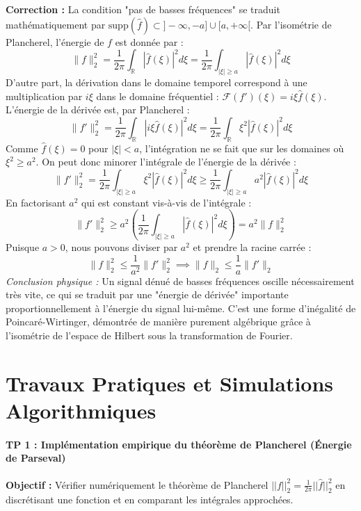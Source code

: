 \documentclass[11pt,a4paper]{article}
\begin{document}
\textbf{Correction :}
La condition "pas de basses fréquences" se traduit mathématiquement par $\text{supp}(\hat{f}) \subset ]-\infty, -a] \cup [a, +\infty[$.
Par l'isométrie de Plancherel, l'énergie de $f$ est donnée par :
$$ \|f\|_2^2 = \frac{1}{2\pi} \int_{\mathbb{R}} |\hat{f}(\xi)|^2 d\xi = \frac{1}{2\pi} \int_{|\xi| \ge a} |\hat{f}(\xi)|^2 d\xi $$
D'autre part, la dérivation dans le domaine temporel correspond à une multiplication par $i\xi$ dans le domaine fréquentiel : $\mathcal{F}(f')(\xi) = i\xi \hat{f}(\xi)$.
L'énergie de la dérivée est, par Plancherel :
$$ \|f'\|_2^2 = \frac{1}{2\pi} \int_{\mathbb{R}} |i\xi \hat{f}(\xi)|^2 d\xi = \frac{1}{2\pi} \int_{\mathbb{R}} \xi^2 |\hat{f}(\xi)|^2 d\xi $$
Comme $\hat{f}(\xi) = 0$ pour $|\xi| < a$, l'intégration ne se fait que sur les domaines où $\xi^2 \ge a^2$.
On peut donc minorer l'intégrale de l'énergie de la dérivée :
$$ \|f'\|_2^2 = \frac{1}{2\pi} \int_{|\xi| \ge a} \xi^2 |\hat{f}(\xi)|^2 d\xi \ge \frac{1}{2\pi} \int_{|\xi| \ge a} a^2 |\hat{f}(\xi)|^2 d\xi $$
En factorisant $a^2$ qui est constant vis-à-vis de l'intégrale :
$$ \|f'\|_2^2 \ge a^2 \left( \frac{1}{2\pi} \int_{|\xi| \ge a} |\hat{f}(\xi)|^2 d\xi \right) = a^2 \|f\|_2^2 $$
Puisque $a > 0$, nous pouvons diviser par $a^2$ et prendre la racine carrée :
$$ \|f\|_2^2 \le \frac{1}{a^2} \|f'\|_2^2 \implies \|f\|_2 \le \frac{1}{a} \|f'\|_2 $$
\textit{Conclusion physique :} Un signal dénué de basses fréquences oscille nécessairement très vite, ce qui se traduit par une "énergie de dérivée" importante proportionnellement à l'énergie du signal lui-même. C'est une forme d'inégalité de Poincaré-Wirtinger, démontrée de manière purement algébrique grâce à l'isométrie de l'espace de Hilbert sous la transformation de Fourier.





\newpage
\part{Travaux Pratiques et Simulations Algorithmiques}
\subsection*{TP 1 : Implémentation empirique du théorème de Plancherel (Énergie de Parseval)}

\textbf{Objectif :} Vérifier numériquement le théorème de Plancherel $||f||_2^2 = \frac{1}{2\pi} ||\hat{f}||_2^2$ en discrétisant une fonction et en comparant les intégrales approchées.
\end{document}

